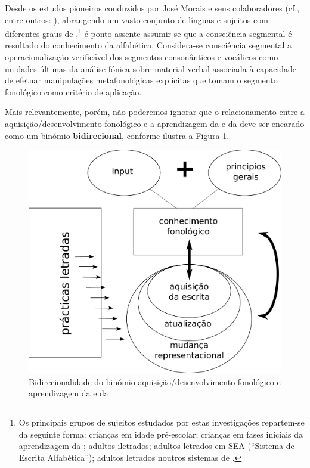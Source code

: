 \documentclass[output=paper]{LSP/langsci}
\begin{document}
\newpage Desde os estudos pioneiros conduzidos por José Morais e seus colaboradores (cf., entre outros: \citealt{alegriamorais1979,morais_etal1979,nakamura_etal1998}), abrangendo um vasto conjunto de línguas e sujeitos com diferentes graus de ,\footnote{Os principais grupos de sujeitos estudados por estas investigações repartem-se da seguinte forma: crianças em idade pré-escolar; crianças em fases iniciais da aprendizagem da ; adultos iletrados; adultos letrados em SEA (``Sistema de Escrita Alfabética''); adultos letrados noutros sistemas de .} é ponto assente assumir-se que a consciência segmental é resultado do conhecimento da  alfabética. Considera-se consciência segmental a operacionalização verificável dos segmentos consonânticos e vocálicos como unidades últimas da análise fónica sobre material verbal associada à capacidade de efetuar manipulações metafonológicas explícitas que tomam o segmento fonológico como critério de aplicação.

Mais relevantemente, porém, não poderemos ignorar que o relacionamento entre a aquisição/desenvolvimento fonológico e a aprendizagem da  e da  deve ser encarado como um binómio \textbf{bidirecional}, conforme ilustra a Figura \ref{fig:miranda_1}.

\begin{figure}
  \includegraphics[height=.3\textheight]{figures/miranda_1.pdf}
  \caption{Bidirecionalidade do binómio aquisição/desenvolvimento fonológico e aprendizagem da  e da  \citep{miranda2014}}
  \label{fig:miranda_1}
\end{figure}
\end{document}
